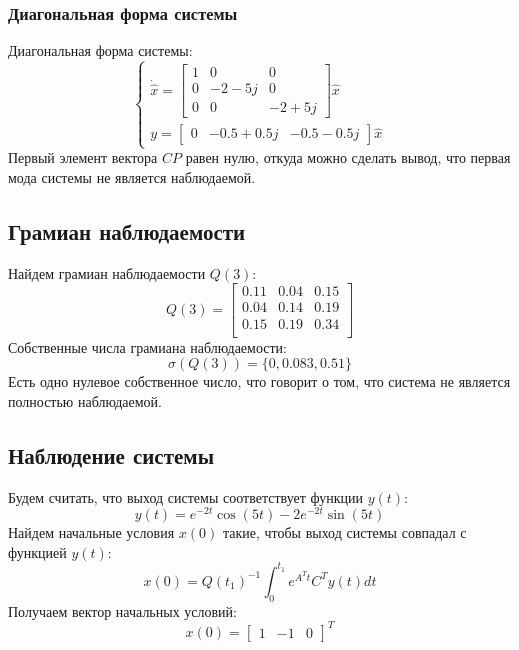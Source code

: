 \subsubsection{Диагональная форма системы}
Диагональная форма системы:
\begin{equation}
    \begin{cases}
        \dot{\hat{x}} = \begin{bmatrix}
            1 & 0 & 0 \\
            0 & -2-5j & 0 \\
            0 & 0 & -2+5j
        \end{bmatrix} \hat{x} \\ 
        y = \begin{bmatrix}
            0 & -0.5+0.5j & -0.5-0.5j
        \end{bmatrix} \hat{x}
    \end{cases}
\end{equation}
Первый элемент вектора $CP$ равен нулю, откуда можно сделать вывод, что первая мода системы не является наблюдаемой. 

\subsection{Грамиан наблюдаемости}
Найдем грамиан наблюдаемости $Q(3)$:
\begin{equation}
    Q(3) = \begin{bmatrix}
        0.11  & 0.04  & 0.15 \\ 
        0.04  & 0.14  & 0.19 \\ 
        0.15  & 0.19  & 0.34 \\ 
        \end{bmatrix}
\end{equation}
Собственные числа грамиана наблюдаемости:
\begin{equation}
    \sigma(Q(3)) = \{0, 0.083, 0.51\}
\end{equation}
Есть одно нулевое собственное число, что говорит о том, что система не является полностью наблюдаемой.

\subsection{Наблюдение системы}
Будем считать, что выход системы соответствует функции $y(t)$:
\begin{equation}
    y(t) = e^{-2t} \cos(5t) -2e^{-2t} \sin(5t) 
\end{equation}
Найдем начальные условия $x(0)$ такие, чтобы выход системы совпадал с функцией $y(t)$:
\begin{equation}
    x(0) = Q(t_1)^{-1} \int_0^{t_1} e^{A^Tt}C^Ty(t)dt
\end{equation}
Получаем вектор начальных условий:
\begin{equation}
    x(0) = \begin{bmatrix}
        1 & -1 & 0
    \end{bmatrix}^T
\end{equation}

